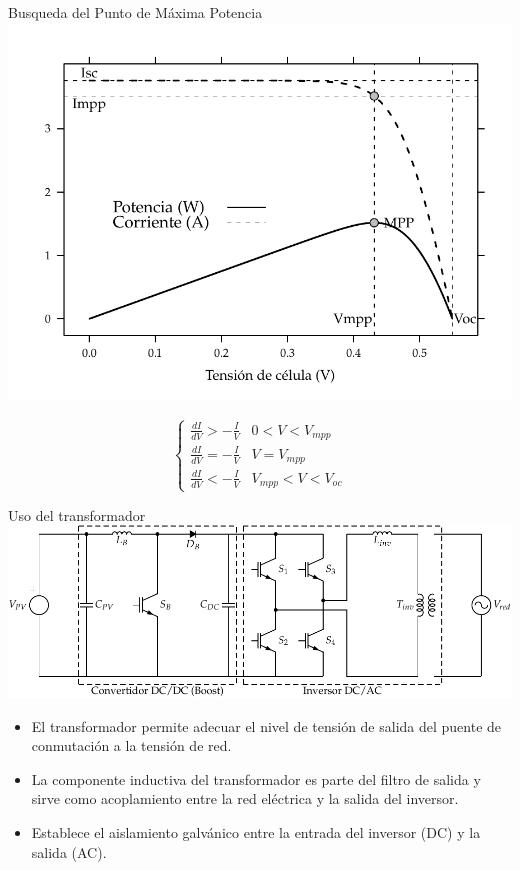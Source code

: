 \documentclass[xcolor={usenames,svgnames,dvipsnames}]{beamer}
\begin{document}
\begin{frame}[label=sec-2-0-14]{Busqueda del Punto de Máxima Potencia}
\includegraphics[width=.9\linewidth]{../figs/CurvaIV_Ta20_G800.pdf}

$$\begin{cases}
      \frac{dI}{dV}>-\frac{I}{V} & 0<V<V_{mpp}\\
      \frac{dI}{dV}=-\frac{I}{V} & V=V_{mpp}\\
      \frac{dI}{dV}<-\frac{I}{V} & V_{mpp}<V<V_{oc}\end{cases}$$
\end{frame}

\begin{frame}[label=sec-2-0-15]{Uso del transformador}
\includegraphics[width=.9\linewidth]{../figs/InversorPV.pdf}

\begin{itemize}
\item El transformador permite adecuar el nivel de tensión de salida del
puente de conmutación a la tensión de red.

\item La componente inductiva del transformador es parte del filtro de
salida y sirve como acoplamiento entre la red eléctrica y la salida
del inversor.

\item Establece el aislamiento galvánico entre la entrada del inversor (DC)
y la salida (AC).
\end{itemize}
\end{frame}
\end{document}
